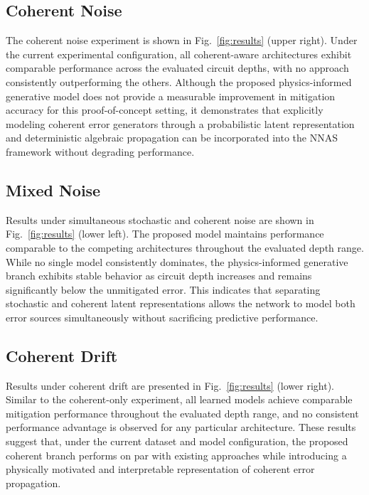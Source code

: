 \subsection{Coherent Noise}

The coherent noise experiment is shown in Fig.~\ref{fig:results} (upper right). Under the current experimental configuration, all coherent-aware architectures exhibit comparable performance across the evaluated circuit depths, with no approach consistently outperforming the others. Although the proposed physics-informed generative model does not provide a measurable improvement in mitigation accuracy for this proof-of-concept setting, it demonstrates that explicitly modeling coherent error generators through a probabilistic latent representation and deterministic algebraic propagation can be incorporated into the NNAS framework without degrading performance.

\subsection{Mixed Noise}

Results under simultaneous stochastic and coherent noise are shown in Fig.~\ref{fig:results} (lower left). The proposed model maintains performance comparable to the competing architectures throughout the evaluated depth range. While no single model consistently dominates, the physics-informed generative branch exhibits stable behavior as circuit depth increases and remains significantly below the unmitigated error. This indicates that separating stochastic and coherent latent representations allows the network to model both error sources simultaneously without sacrificing predictive performance.

\subsection{Coherent Drift}

Results under coherent drift are presented in Fig.~\ref{fig:results} (lower right). Similar to the coherent-only experiment, all learned models achieve comparable mitigation performance throughout the evaluated depth range, and no consistent performance advantage is observed for any particular architecture. These results suggest that, under the current dataset and model configuration, the proposed coherent branch performs on par with existing approaches while introducing a physically motivated and interpretable representation of coherent error propagation.

